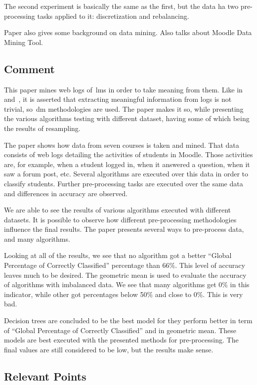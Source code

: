 The second experiment is basically the same as the first, but the data ha two
pre-processing tasks applied to it: discretization and rebalancing.

Paper also gives some background on data mining. Also talks about Moodle Data
Mining Tool.

\subsection{Comment}

This paper mines web logs of~\gls{lms} in order to take meaning from them. Like
in~\cite{ind_007} and~\cite{ind_008}, it is asserted that extracting meaningful
information from logs is not trivial, so~\gls{dm} methodologies are used. The
paper makes it so, while presenting the various algorithms testing with
different dataset, having some of which being the results of resampling.

The paper shows how data from seven courses is taken and mined. That data
consists of web logs detailing the activities of students in Moodle. Those
activities are, for example, when a student logged in, when it answered a
question, when it saw a forum post, etc. Several algorithms are executed over
this data in order to classify students. Further pre-processing tasks are
executed over the same data and differences in accuracy are observed.

We are able to see the results of various algorithms executed with different
datasets. It is possible to observe how different pre-processing methodologies
influence the final results. The paper presents several ways to pre-process
data, and many algorithms.

Looking at all of the results, we see that no algorithm got a better ``Global
Percentage of Correctly Classified'' percentage than 66\%. This level of
accuracy leaves much to be desired. The geometric mean is used to evaluate the
accuracy of algorithms with imbalanced data. We see that many algorithms get
0\% in this indicator, while other got percentages below 50\% and close to 0\%.
This is very bad.

Decision trees are concluded to be the best model for they perform better in
term of ``Global Percentage of Correctly Classified'' and in geometric mean.
These models are best executed with the presented methods for pre-processing.
The final values are still considered to be low, but the results make sense.

\subsection{Relevant Points}

